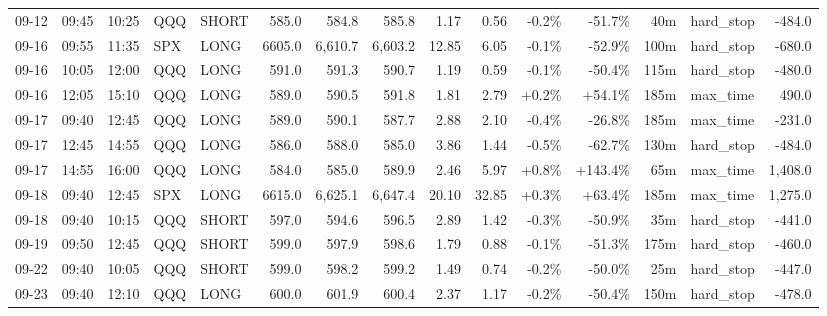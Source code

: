 \documentclass[11pt,a4paper,twoside]{article}
\begin{document}
\begin{landscape}
\begin{center}
\begin{longtable}{>{\color{txtmain}}l l l l l r r r r r r r r >{\color{txtmain}}l r}
09-12 & 09:45 & 10:25 & QQQ & SHORT & 585.0 & 584.8 & 585.8 & 1.17 & 0.56 & \textcolor{lossred}{-0.2\%} & \textcolor{lossred}{-51.7\%} & 40m & hard\_stop & \textcolor{lossred}{-484.0} \\
09-16 & 09:55 & 11:35 & SPX & LONG & 6605.0 & 6,610.7 & 6,603.2 & 12.85 & 6.05 & \textcolor{lossred}{-0.1\%} & \textcolor{lossred}{-52.9\%} & 100m & hard\_stop & \textcolor{lossred}{-680.0} \\
09-16 & 10:05 & 12:00 & QQQ & LONG & 591.0 & 591.3 & 590.7 & 1.19 & 0.59 & \textcolor{lossred}{-0.1\%} & \textcolor{lossred}{-50.4\%} & 115m & hard\_stop & \textcolor{lossred}{-480.0} \\
09-16 & 12:05 & 15:10 & QQQ & LONG & 589.0 & 590.5 & 591.8 & 1.81 & 2.79 & \textcolor{wingreen}{+0.2\%} & \textcolor{wingreen}{+54.1\%} & 185m & max\_time & \textcolor{wingreen}{490.0} \\
09-17 & 09:40 & 12:45 & QQQ & LONG & 589.0 & 590.1 & 587.7 & 2.88 & 2.10 & \textcolor{lossred}{-0.4\%} & \textcolor{lossred}{-26.8\%} & 185m & max\_time & \textcolor{lossred}{-231.0} \\
09-17 & 12:45 & 14:55 & QQQ & LONG & 586.0 & 588.0 & 585.0 & 3.86 & 1.44 & \textcolor{lossred}{-0.5\%} & \textcolor{lossred}{-62.7\%} & 130m & hard\_stop & \textcolor{lossred}{-484.0} \\
09-17 & 14:55 & 16:00 & QQQ & LONG & 584.0 & 585.0 & 589.9 & 2.46 & 5.97 & \textcolor{wingreen}{+0.8\%} & \textcolor{wingreen}{+143.4\%} & 65m & max\_time & \textcolor{wingreen}{1,408.0} \\
09-18 & 09:40 & 12:45 & SPX & LONG & 6615.0 & 6,625.1 & 6,647.4 & 20.10 & 32.85 & \textcolor{wingreen}{+0.3\%} & \textcolor{wingreen}{+63.4\%} & 185m & max\_time & \textcolor{wingreen}{1,275.0} \\
09-18 & 09:40 & 10:15 & QQQ & SHORT & 597.0 & 594.6 & 596.5 & 2.89 & 1.42 & \textcolor{lossred}{-0.3\%} & \textcolor{lossred}{-50.9\%} & 35m & hard\_stop & \textcolor{lossred}{-441.0} \\
09-19 & 09:50 & 12:45 & QQQ & SHORT & 599.0 & 597.9 & 598.6 & 1.79 & 0.88 & \textcolor{lossred}{-0.1\%} & \textcolor{lossred}{-51.3\%} & 175m & hard\_stop & \textcolor{lossred}{-460.0} \\
09-22 & 09:40 & 10:05 & QQQ & SHORT & 599.0 & 598.2 & 599.2 & 1.49 & 0.74 & \textcolor{lossred}{-0.2\%} & \textcolor{lossred}{-50.0\%} & 25m & hard\_stop & \textcolor{lossred}{-447.0} \\
09-23 & 09:40 & 12:10 & QQQ & LONG & 600.0 & 601.9 & 600.4 & 2.37 & 1.17 & \textcolor{lossred}{-0.2\%} & \textcolor{lossred}{-50.4\%} & 150m & hard\_stop & \textcolor{lossred}{-478.0} \\

\end{longtable}
\end{center}
\end{landscape}
\end{document}
